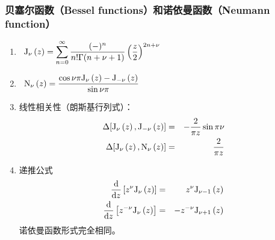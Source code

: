 \documentclass[12pt,a4paper]{article}
\newcommand\dif{\mathrm{d}}
\renewcommand{\[}{\ $\displaystyle}
\renewcommand{\]}{$\ }%
\newcommand{\fdif}[2]{\ensuremath{\frac{\dif #1}{\dif #2}}}
\newcommand{\summ}[2][n]{\sum_{#1=#2}^\infty}
\begin{document}
	  \subsubsection{贝塞尔函数（Bessel functions）和诺依曼函数（Neumann function）}
	   \begin{enumerate}
	     \item \[
	     	  \fj{z} =\summ{0} \frac{(-)^n}{n! \Gamma(n + \nu + 1)}\left(\frac z2\right)^{2n+\nu} 
	     	\]
	     \item \[
	     	  \fn{z} = \frac{\cos \nu\pi \fj{z} - \fj[-\nu]{z}}{\sin \nu\pi} 
	     	\]
	     \item 线性相关性（朗斯基行列式）：
	     	\begin{eqnarray*}
	     	 \Delta[\fj{z},\fj[-\nu]{z}] &=& -\frac{2}{\pi z}\sin \pi\nu \\
	     	 \Delta[\fj{z},\fn{z}] &=& \frac{2}{\pi z}
	     	\end{eqnarray*}
	     \item 递推公式
	     	\begin{eqnarray*}
	     	 \fdif{}{z}\left[z^\nu\fj[\nu]{z}\right] &=& z^\nu\fj[\nu -1]{z} \\
	     	 \fdif{}{z}\left[z^{-\nu}\fj[\nu]{z}\right] &=& -z^{-\nu}\fj[\nu +1]{z} 
	     	\end{eqnarray*}
	     	诺依曼函数形式完全相同。

\end{enumerate}
\end{document}
